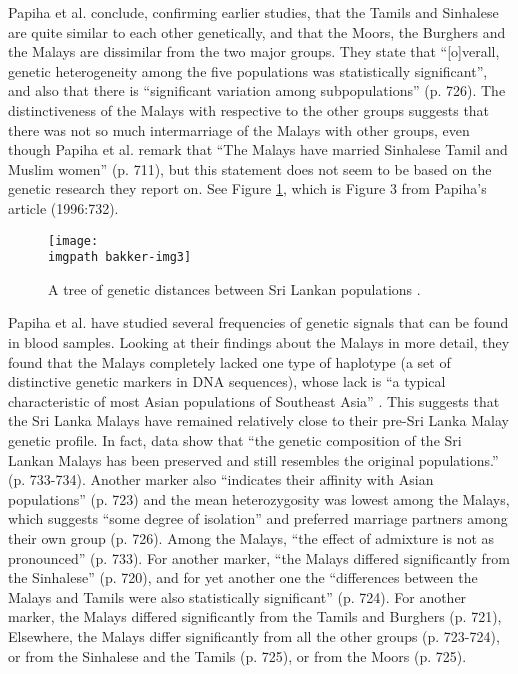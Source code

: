 Papiha et al. conclude, confirming earlier studies, that the Tamils and Sinhalese are quite similar to each other genetically, and that the Moors, the Burghers and the Malays are dissimilar from the two major groups. They state that ``[o]verall, genetic heterogeneity among the five populations was statistically significant'', and also that there is ``significant variation among subpopulations'' (p. 726). The distinctiveness of the Malays with respective to the other groups suggests that there was not so much intermarriage of the Malays with other groups, even though Papiha et al. remark that ``The Malays have married Sinhalese Tamil and Muslim women'' (p. 711), but this statement does not seem to be based on the genetic research they report on. See Figure \ref{fig:bakker1}, which is Figure 3 from Papiha's article (1996:732). 

\begin{figure}%
\texttt{[image: \\imgpath bakker-img3]}
\caption[Genetic distances between Sri Lankan populations]{A tree of genetic distances between Sri Lankan populations \citep[from][732]{PapihaEtAl1996}.}
\label{fig:bakker1}
\end{figure}


Papiha et al. have studied several frequencies of genetic signals that can be found in blood samples. Looking at their findings about the Malays in more detail, they found that the Malays completely lacked one type of haplotype (a set of distinctive genetic markers in DNA sequences), whose lack is ``a typical characteristic of most Asian populations of Southeast Asia'' \citep[719]{PapihaEtAl1996}. This suggests that the Sri Lanka Malays have remained relatively close to their pre-Sri Lanka Malay genetic profile. In fact, data show that ``the genetic composition of the Sri Lankan Malays has been preserved and still resembles the original populations.'' (p. 733-734). Another marker also ``indicates their affinity with Asian populations'' (p. 723) and the mean heterozygosity was lowest among the Malays, which suggests ``some degree of isolation'' and preferred marriage partners among their own group (p. 726). Among the Malays, ``the effect of admixture is not as pronounced'' (p. 733). For another marker, ``the Malays differed significantly from the Sinhalese'' (p. 720), and for yet another one the ``differences between the Malays and Tamils were also statistically significant'' (p. 724). For another marker, the Malays differed significantly from the Tamils and Burghers (p. 721), Elsewhere, the Malays differ significantly from all the other groups (p. 723-724), or from the Sinhalese and the Tamils (p. 725), or from the Moors (p. 725). 

